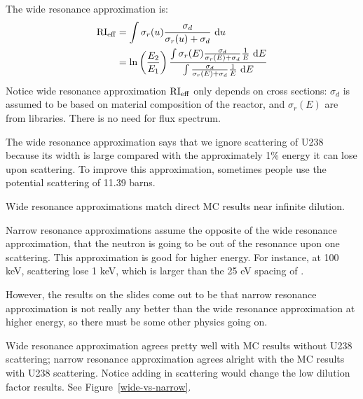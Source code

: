 \documentclass{school-22.211-notes}
\date{February 22, 2012}
\begin{document}
\maketitle

The wide resonance approximation is: 
\begin{align}
\mathrm{RI}_{\mathrm{eff}} &= \int \sigma_r(u) \frac{\sigma_d}{\sigma_r(u) + \sigma_d} \mbox{ }\mathrm{d} u \\
&= \ln \left(\frac{E_2}{E_1} \right) \frac{ \int \sigma_r(E) \frac{\sigma_d}{\sigma_r(E) + \sigma_d} \frac{1}{E} \mbox{ }\mathrm{d} E}{ \int \frac{\sigma_d}{\sigma_r(E) + \sigma_d} \frac{1}{E} \mbox{ }\mathrm{d} E}
\end{align}
Notice wide resonance approximation $\mathrm{RI}_{\mathrm{eff}}$ only depends on cross sections: $\sigma_d$ is assumed to be based on material composition of the reactor, and $\sigma_r(E)$ are from libraries. There is no need for flux spectrum. 

The wide resonance approximation says that we ignore scattering of U238 because its width is large compared with the approximately 1\% energy it can lose upon scattering. To improve this approximation, sometimes people use the potential scattering of 11.39 barns. 

Wide resonance approximations match direct MC results near infinite dilution. 

Narrow resonance approximations assume the opposite of the wide resonance approximation, that the neutron is going to be out of the resonance upon one scattering. This approximation is good for higher energy. For instance, at 100 keV, scattering lose 1 keV, which is larger than the 25 eV spacing of . 

However, the results on the slides come out to be that narrow resonance approximation is not really any better than the wide resonance approximation at higher energy, so there must be some other physics going on. 


Wide resonance approximation agrees pretty well with MC results without U238 scattering; narrow resonance approximation agrees alright with the MC results with U238 scattering. Notice adding in scattering would change the low dilution factor results. See Figure~\ref{wide-vs-narrow}.
\end{document}
